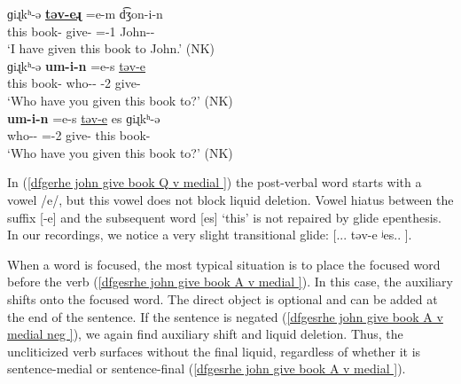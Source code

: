\begin{exe}
	\ex \label{sent:MorphoPhono:Liq:NonConst:Ditrans}
	\begin{xlist}
		
		\ex {} ɡiɻkʰ-ə  \textbf{\uline{təv-eɻ}} \colorbox{lsLightGray}{{=e-m}}  {d͡ʒon-i-n}  
		\\
		this  book-{}  give-{\perfcvb}  ={\auxgloss}-1{\sg}   John-{\dat}-{} 
		\\
		\trans `I have given this book to John.' \hfill (NK) \label{dfgerhe john give book base }
		\\
		\ex {} ɡiɻkʰ-ə \textbf{um-i-n} \colorbox{lsLightGray}{{=e-s}} \uline{təv-e} 
		\\
		this  book-{} who-{\dat}-{} {\auxgloss}-2{\sg} give-{\perfcvb} 
		\\
		\trans `Who have you given this book to?' \hfill (NK) \label{dfgerhe john give book Q v final}
		\\
		\ex \gll  \textbf{um-i-n}  \colorbox{lsLightGray}{{=e-s}} \uline{təv-e}  {es} ɡiɻkʰ-ə 
		\\
		who-{\dat}-{} ={\auxgloss}-2{\sg}   give-{\perfcvb} this  book-{} 
		\\ 
		\trans `Who have you given this book to?' \hfill (NK) \label{dfgerhe john give book Q v medial }
		\\
	\end{xlist}
\end{exe}

In (\ref{dfgerhe john give book Q v medial }) the post-verbal word starts with a vowel /e/, but this vowel does not block liquid deletion. Vowel hiatus between the suffix [-e] and the subsequent word [es] `this' is not repaired by glide epenthesis.  In our recordings, we notice a very slight transitional glide: [... təv-e ʲes.. ].\largerpage

When a word is focused, the most typical situation is to  place the focused word before the verb (\ref{dfgesrhe john give book A v medial }). In this case, the auxiliary shifts onto the focused word. The direct object is optional and can be added at the end of the sentence. If the sentence is negated (\ref{dfgesrhe john give book A v medial neg }), we again find auxiliary shift and liquid deletion. Thus, the uncliticized verb surfaces without the final liquid, regardless of whether it is sentence-medial or sentence-final (\ref{dfgesrhe john give book A v medial }). 

